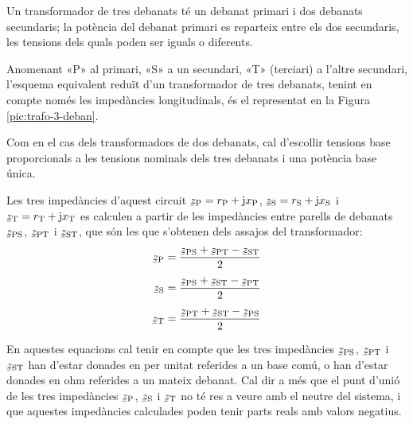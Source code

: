 Un transformador de tres debanats té un debanat primari i dos debanats secundaris; la potència del debanat primari es reparteix entre els dos secundaris, les tensions dels quals poden ser iguals o diferents.

Anomenant «P» al primari, «S» a un secundari, «T» (terciari) a l'altre secundari, l'esquema equivalent reduït d'un transformador de tres debanats, tenint en compte només les impedàncies longitudinals,  és el representat en la Figura \vref{pic:trafo-3-deban}.

\begin{center}
    
    \label{pic:trafo-3-deban}
\end{center}

Com en el cas dels transformadors de dos debanats, cal d'escollir tensions base proporcionals a les tensions nominals dels tres debanats i una potència base única.

Les tres impedàncies d'aquest circuit $\cmplx{z}\ped{P} = r\ped{P} + \ju x\ped{P}$, $\cmplx{z}\ped{S} = r\ped{S} + \ju x\ped{S}$ i $\cmplx{z}\ped{T} = r\ped{T} + \ju x\ped{T}$ es calculen a partir de les impedàncies entre parells de debanats $\cmplx{z}\ped{PS}$, $\cmplx{z}\ped{PT}$ i $\cmplx{z}\ped{ST}$, que són les que s'obtenen dels assajos del transformador:
\begin{subequations}
\begin{align}
    \cmplx{z}\ped{P} &= \frac{\cmplx{z}\ped{PS}+\cmplx{z}\ped{PT}-\cmplx{z}\ped{ST}}{2}  \\[1ex]
    \cmplx{z}\ped{S} &= \frac{\cmplx{z}\ped{PS}+\cmplx{z}\ped{ST}-\cmplx{z}\ped{PT}}{2}  \\[1ex]
    \cmplx{z}\ped{T} &= \frac{\cmplx{z}\ped{PT}+\cmplx{z}\ped{ST}-\cmplx{z}\ped{PS}}{2}
\end{align}
\end{subequations}

En aquestes equacions cal tenir en compte que les tres impedàncies $\cmplx{z}\ped{PS}$, $\cmplx{z}\ped{PT}$ i $\cmplx{z}\ped{ST}$ han d'estar donades en per unitat referides a un base comú, o han d'estar donades en ohm referides a un mateix debanat. Cal dir a més que el punt d'unió de les tres impedàncies $\cmplx{z}\ped{P}$, $\cmplx{z}\ped{S}$ i $\cmplx{z}\ped{T}$ no té res a veure amb el neutre del sistema, i que aquestes impedàncies calculades poden tenir parts reals amb valors  negatius.

